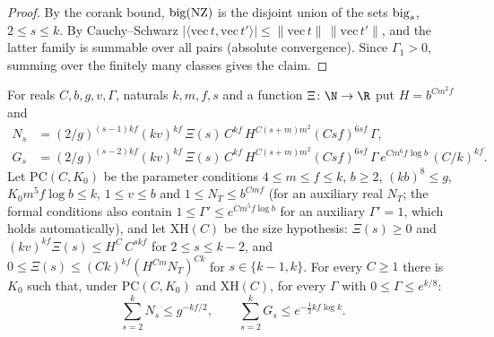 \begin{proof}
By the corank bound, $\operatorname{big}(\mathrm{NZ})$ is the disjoint union of the sets $\operatorname{big}_s$, $2\le s\le k$. By Cauchy--Schwarz
$|\langle\mathrm{vec}\,t,\mathrm{vec}\,t'\rangle|\le\|\mathrm{vec}\,t\|\,\|\mathrm{vec}\,t'\|$, and the latter family is summable over all pairs
(absolute convergence). Since $\Gamma_1>0$, summing over the finitely many classes gives the claim.
\end{proof}

\begin{lemma}\label{pf:open0:corank}
For reals $C,b,g,v,\Gamma$, naturals $k,m,f,s$ and a function $\Xi\colon\N\to\R$ put $H=b^{Cm^2f}$ and
\begin{align*}
N_s&=(2/g)^{(s-1)kf}(kv)^{kf}\,\Xi(s)\,C^{kf}\,H^{C(s+m)m^2}(Csf)^{6sf}\,\Gamma,\\
G_s&=(2/g)^{(s-2)kf}(kv)^{kf}\,\Xi(s)\,C^{kf}\,H^{C(s+m)m^2}(Csf)^{6sf}\,\Gamma\,e^{Cm^6f\log b}\,(C/k)^{kf}.
\end{align*}
Let $\mathrm{PC}(C,K_0)$ be the parameter conditions $4\le m\le f\le k$, $b\ge2$, $(kb)^8\le g$, $K_0m^5f\log b\le k$, $1\le v\le b$ and
$1\le N_T\le b^{Cmf}$ (for an auxiliary real $N_T$; the formal conditions also contain $1\le\Gamma'\le e^{Cm^5f\log b}$ for an auxiliary
$\Gamma'=1$, which holds automatically), and let $\mathrm{XH}(C)$ be the size hypothesis: $\Xi(s)\ge0$ and
$(kv)^{kf}\Xi(s)\le H^C\,C^{skf}$ for $2\le s\le k-2$, and $0\le\Xi(s)\le(Ck)^{kf}(H^{Cm}N_T)^{Ck}$ for $s\in\{k-1,k\}$. For every $C\ge1$
there is $K_0$ such that, under $\mathrm{PC}(C,K_0)$ and $\mathrm{XH}(C)$, for every $\Gamma$ with $0\le\Gamma\le e^{k/8}$:
\[
\sum_{s=2}^kN_s\le g^{-kf/2},\qquad\sum_{s=2}^kG_s\le e^{-\frac12kf\log k}.
\]
\ \
\ \
\ \
\end{lemma}

